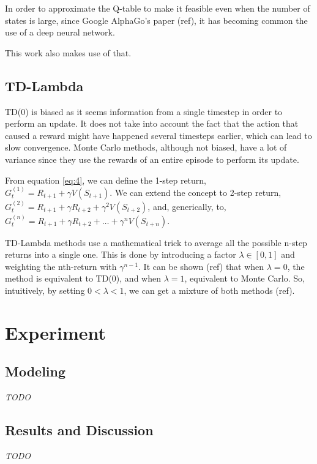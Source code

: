 \documentclass[11pt,twoside]{article}
\begin{document}

In order to approximate the Q-table to make it feasible even when the number of states is large, since Google AlphaGo's paper (ref), it has becoming common the use of a deep neural network.

This work also makes use of that.

\subsection{TD-Lambda}

TD(0) is biased as it seems information from a single timestep in order to perform an update. It does not take into account the fact that the action that caused a reward might have happened several timesteps earlier, which can lead to slow convergence. Monte Carlo methods, although not biased, have a lot of variance since they use the rewards of an entire episode to perform its update.

From equation \ref{eq:4}, we can define the 1-step return, $G_t^{(1)} = R_{t+1} + \gamma V(S_{t+1})$. We can extend the concept to 2-step return, $G_t^{(2)} = R_{t+1} + \gamma R_{t+2} + \gamma^2 V(S_{t+2})$, and, generically, to, $G_t^{(n)} = R_{t+1} + \gamma R_{t+2} + \ldots + \gamma^n V(S_{t+n})$. 

TD-Lambda methods use a mathematical trick to average all the possible n-step returns into a single one. This is done by introducing a factor $\lambda \in [0, 1]$ and weighting the nth-return with $\gamma^{n-1}$. It can be shown (ref) that when $\lambda = 0$, the method is equivalent to TD(0), and when $\lambda = 1$, equivalent to Monte Carlo. So, intuitively, by setting $0 < \lambda < 1$, we can get a mixture of both methods (ref).


\section{Experiment}
\label{sec:exper}

\subsection{Modeling}

\textit{TODO}

\subsection{Results and Discussion}

\textit{TODO}



\end{document}
